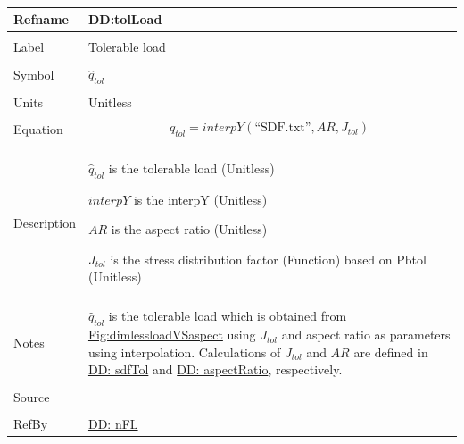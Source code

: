 \documentclass[12pt]{article}
\begin{document}
\par~

\noindent \begin{minipage}{\textwidth}
          \begin{tabular}{>{\raggedright}p{}>{\raggedright\arraybackslash}p{}}
          \toprule \textbf{Refname} & \textbf{DD:tolLoad}
          \label{DD:tolLoad}
          \\ \midrule \\
          Label & Tolerable load
          \\ \midrule \\
          Symbol & ${\hat{q}_{tol}}$
          \\ \midrule \\
          Units & Unitless
          \\ \midrule \\
          Equation & \begin{displaymath}
                     {\hat{q}_{tol}}=interpY\left(\text{``SDF.txt''},AR,{J_{tol}}\right)
                     \end{displaymath}
          \\ \midrule \\
          Description & \begin{symbDescription}
                        \item{${\hat{q}_{tol}}$ is the tolerable load (Unitless)}
                        \item{$interpY$ is the interpY (Unitless)}
                        \item{$AR$ is the aspect ratio (Unitless)}
                        \item{${J_{tol}}$ is the stress distribution factor (Function) based on Pbtol (Unitless)}
                        \end{symbDescription}
          \\ \midrule \\
          Notes & ${\hat{q}_{tol}}$ is the tolerable load which is obtained from \hyperref[Figure:dimlessloadVSaspect]{Fig:dimlessloadVSaspect} using ${J_{tol}}$ and aspect ratio as parameters using interpolation. Calculations of ${J_{tol}}$ and $AR$ are defined in \hyperref[DD:sdfTol]{DD: sdfTol} and \hyperref[DD:aspectRatio]{DD: aspectRatio}, respectively.
          \\ \midrule \\
          Source & \cite{astm2009}
          \\ \midrule \\
          RefBy & \hyperref[DD:nFL]{DD: nFL}
          \\ \bottomrule
          \end{tabular}
          \end{minipage}
\par~
\end{document}
